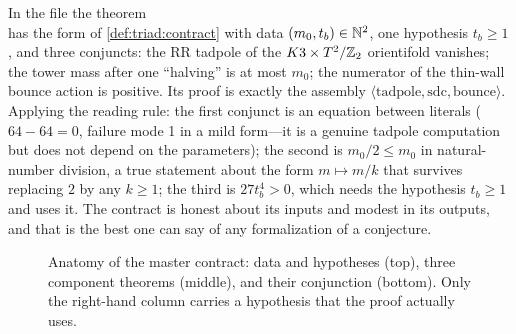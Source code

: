 \begin{example}\label{ex:triad:master}
In the file  the theorem\\
has the form of \cref{def:triad:contract} with data $(m_0,t_b)\in\mathbb{N}^2$, one hypothesis
$t_b\ge1$, and three conjuncts: the RR tadpole of the $K3\times T^2/\mathbb{Z}_2$ orientifold vanishes; the
tower mass after one ``halving'' is at most $m_0$; the numerator of the thin-wall bounce action
is positive. Its proof is exactly the assembly $\langle\text{tadpole},\text{sdc},
\text{bounce}\rangle$. Applying the reading rule: the first conjunct is an equation between
literals ($64-64=0$, failure mode 1 in a mild form---it is a genuine tadpole computation but
does not depend on the parameters); the second is $m_0/2\le m_0$ in natural-number division,
a true statement about the form $m\mapsto m/k$ that survives replacing $2$ by any $k\ge1$; the
third is $27t_b^4>0$, which needs the hypothesis $t_b\ge1$ and uses it. The contract is
honest about its inputs and modest in its outputs, and that is the best one can say of any
formalization of a conjecture.
\end{example}

\begin{figure}[ht]
\centering
{}
\caption{Anatomy of the master contract: data and hypotheses (top), three component theorems
(middle), and their conjunction (bottom). Only the right-hand column carries a hypothesis
that the proof actually uses.}
\label{fig:triad:contract}
\end{figure}

